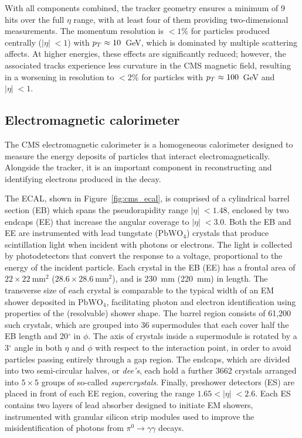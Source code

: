 With all components combined, the tracker geometry ensures a minimum of 9 hits over the full $\eta$ range, with at least four of them providing two-dimensional measurements. The momentum resolution is $<1\%$ for particles produced centrally ($|\eta|\;<1$) with $p_T \approx 10$~GeV, which is dominated by multiple scattering affects. At higher energies, these effects are significantly reduced; however, the associated tracks experience less curvature in the CMS magnetic field, resulting in a worsening in \pt resolution to $<2\%$ for particles with $p_T \approx 100$~GeV and $|\eta|\;<1$.

\subsection{Electromagnetic calorimeter}


The CMS electromagnetic calorimeter is a homogeneous calorimeter designed to measure the energy deposits of particles that interact electromagnetically. Alongside the tracker, it is an important component in reconstructing and identifying electrons produced in the \Hee decay.

The ECAL, shown in Figure~\ref{fig:cms_ecal}, is comprised of a cylindrical barrel section (EB) which spans the pseudorapidity range $|\eta|\;<1.48$, enclosed by two endcaps (EE) that increase the angular coverage to $|\eta|\;<3.0$. Both the EB and EE are instrumented with lead tungstate  ($\mathrm{PbWO}_{4}$) crystals that produce scintillation light when incident with photons or electrons. The light is collected by photodetectors that convert the response to a voltage, proportional to the energy of the incident particle. Each crystal in the EB (EE) has a frontal area of $22\times22~\mathrm{mm}^2$ ($28.6\times28.6~\mathrm{mm}^2$), and is 230~mm (220~mm) in length. The transverse size of each crystal is comparable to the typical width of an EM shower deposited in $\mathrm{PbWO}_{4}$, facilitating photon and electron identification using properties of the (resolvable) shower shape. The barrel region consists of 61,200 such crystals, which are grouped into 36 supermodules that each cover half the EB length and 20$^{\circ}$ in $\phi$. The axis of crystals inside a supermodule is rotated by a 3$^{\circ}$ angle in both $\eta$ and $\phi$ with respect to the interaction point, in order to avoid particles passing entirely through a gap region. The endcaps, which are divided into two semi-circular halves, or \textit{dee's}, each hold a further 3662 crystals arranged into $5\times5$ groups of so-called \textit{supercrystals}. Finally, preshower detectors (ES) are placed in front of each EE region, covering the range $1.65<|\eta|\;<2.6$. 
Each ES contains two layers of lead absorber designed to initiate EM showers, instrumented with granular silicon strip modules used to improve the misidentification of photons from $\pi^{0}\rightarrow \gamma\gamma$ decays.

